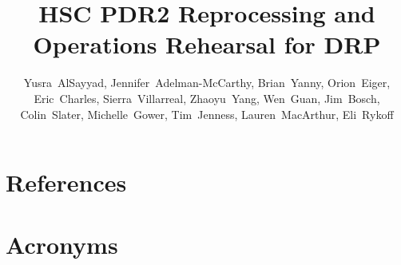 \documentclass[OPS,authoryear,toc]{lsstdoc}
\title{HSC PDR2 Reprocessing and Operations Rehearsal for DRP}
\author{%
Yusra~AlSayyad, 
Jennifer~Adelman-McCarthy, 
Brian~Yanny, 
Orion~Eiger, 
Eric~Charles, 
Sierra~Villarreal, 
Zhaoyu~Yang, 
Wen~Guan, 
Jim~Bosch, 
Colin~Slater, 
Michelle~Gower, 
Tim~Jenness, 
Lauren~MacArthur, 
Eli~Rykoff
}
\date{\vcsDate}
\begin{document}
\maketitle


\appendix
\section{References} \label{sec:bib}
\renewcommand{\refname}{} %


\section{Acronyms} \label{sec:acronyms}

\end{document}
